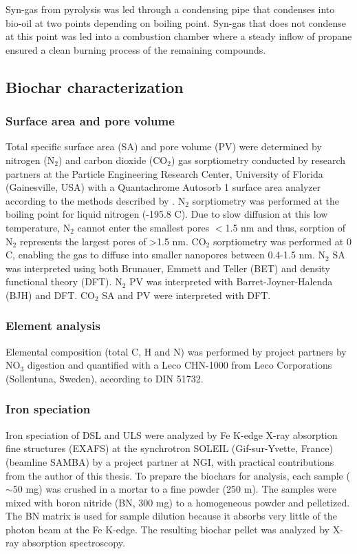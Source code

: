 Syn-gas from pyrolysis was led through a condensing pipe that condenses into bio-oil at two points depending on boiling point. Syn-gas that does not condense at this point was led into a combustion chamber where a steady inflow of propane ensured a clean burning process of the remaining compounds.

\subsection{Biochar characterization}

\subsubsection{Surface area and pore volume}
Total specific surface area (SA) and pore volume (PV) were determined by nitrogen ($\mathrm{N_2}$) and carbon dioxide ($\mathrm{CO_2}$) gas sorptiometry conducted by research partners at the Particle Engineering Research Center, University of Florida (Gainesville, USA) with a Quantachrome Autosorb 1 surface area analyzer according to the methods described by \cite{kwon2005}. $\mathrm{N_2}$ sorptiometry was performed at the boiling point for liquid nitrogen (-195.8 \textdegree C). Due to slow diffusion at this low temperature, $\mathrm{N_2}$ cannot enter the smallest pores $<$1.5 nm and thus, sorption of $\mathrm{N_2}$ represents the largest pores of \textgreater 1.5 nm. $\mathrm{CO_2}$ sorptiometry was performed at 0 \textdegree C, enabling the gas to diffuse into smaller nanopores between 0.4-1.5 nm. $\mathrm{N_2}$ SA was interpreted using both Brunauer, Emmett and Teller (BET) and density functional theory (DFT). $\mathrm{N_2}$ PV was interpreted with Barret-Joyner-Halenda (BJH) and DFT. $\mathrm{CO_2}$ SA and PV were interpreted with DFT. 

\subsubsection{Element analysis}
Elemental composition (total C, H and N) was performed by project partners by $\mathrm{NO_3}$ digestion and quantified with a Leco CHN-1000 from Leco Corporations (Sollentuna, Sweden), according to DIN 51732.  

\subsubsection{Iron speciation}
Iron speciation of DSL and ULS were analyzed by Fe K-edge X-ray absorption fine structures (EXAFS) at the synchrotron SOLEIL (Gif-sur-Yvette, France) (beamline SAMBA) by a project partner at NGI, with practical contributions from the author of this thesis. To prepare the biochars for analysis, each sample ($\sim$50 mg) was crushed in a mortar to a fine powder (250 \textmu m). The samples were mixed with boron nitride (BN, 300 mg) to a homogeneous powder and pelletized. The BN matrix is used for sample dilution because it absorbs very little of the photon beam at the Fe K-edge. The resulting biochar pellet was analyzed by X-ray absorption spectroscopy.

